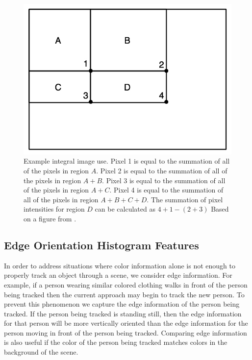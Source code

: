 \documentclass[11pt]{article}
\begin{document}
\begin{figure}[H]
\centering
\includegraphics[scale=.4]{img/IntegralImageUse.jpg}
\caption{Example integral image use. Pixel 1 is equal to the summation of all of the pixels in region $A$. Pixel 2 is equal to the summation of all of the pixels in region $A+B$. Pixel 3 is equal to the summation of all of the pixels in region $A+C$. Pixel 4 is equal to the summation of all of the pixels in region $A+B+C+D$. The summation of pixel intensities for region $D$ can be calculated as $4+1-(2+3)$  Based on a figure from \cite{facedetection}.}
\label{fig:integralimguse}
\end{figure}


\subsection{Edge Orientation Histogram Features}
\label{sec:edgehist}

In order to address situations where color information alone is not enough to properly track an object through a scene, we consider edge information. For example, if a person wearing similar colored clothing walks in front of the person being tracked then the current approach may begin to track the new person. To prevent this phenomenon we capture the edge information of the person being tracked. If the person being tracked is standing still, then the edge information for that person will be more vertically oriented than the edge information for the person moving in front of the person being tracked. Comparing edge information is also useful if the color of the person being tracked matches colors in the background of the scene. 
\end{document}
